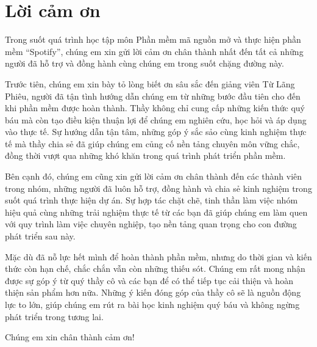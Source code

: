 \chapter*{Lời cảm ơn}
Trong suốt quá trình học tập môn Phần mềm mã nguồn mở và thực hiện phần mềm “Spotify”, chúng em xin gửi lời cảm ơn chân thành nhất đến tất cả những người đã hỗ trợ và đồng hành cùng chúng em trong suốt chặng đường này.


Trước tiên, chúng em xin bày tỏ lòng biết ơn sâu sắc đến giảng viên Từ Lãng Phiêu, người đã tận tình hướng dẫn chúng em từ những bước đầu tiên cho đến khi phần mềm được hoàn thành. Thầy không chỉ cung cấp những kiến thức quý báu mà còn tạo điều kiện thuận lợi để chúng em nghiên cứu, học hỏi và áp dụng vào thực tế. Sự hướng dẫn tận tâm, những góp ý sắc sảo cùng kinh nghiệm thực tế mà thầy chia sẻ đã giúp chúng em củng cố nền tảng chuyên môn vững chắc, đồng thời vượt qua những khó khăn trong quá trình phát triển phần mềm.


Bên cạnh đó, chúng em cũng xin gửi lời cảm ơn chân thành đến các thành viên trong nhóm, những người đã luôn hỗ trợ, đồng hành và chia sẻ kinh nghiệm trong suốt quá trình thực hiện dự án. Sự hợp tác chặt chẽ, tinh thần làm việc nhóm hiệu quả cùng những trải nghiệm thực tế từ các bạn đã giúp chúng em làm quen với quy trình làm việc chuyên nghiệp, tạo nền tảng quan trọng cho con đường phát triển sau này.


Mặc dù đã nỗ lực hết mình để hoàn thành phần mềm, nhưng do thời gian và kiến thức còn hạn chế, chắc chắn vẫn còn những thiếu sót. Chúng em rất mong nhận được sự góp ý từ quý thầy cô và các bạn để có thể tiếp tục cải thiện và hoàn thiện sản phẩm hơn nữa. Những ý kiến đóng góp của thầy cô sẽ là nguồn động lực to lớn, giúp chúng em rút ra bài học kinh nghiệm quý báu và không ngừng phát triển trong tương lai.


Chúng em xin chân thành cảm ơn!